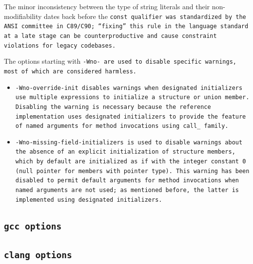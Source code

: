 \begin{itemize}
\note\qquad The minor inconsistency between the type of string literals
and their non-modifiability dates back before the \tt{const}
qualifier was standardized by the ANSI committee in C89/C90;
``fixing'' this rule in the language standard at a late stage can be
counterproductive and cause constraint violations for legacy codebases.

\end{itemize}

The options starting with \tt{-Wno-} are used to disable
specific warnings, most of which are considered harmless.

\begin{itemize}

\item \tt{-Wno-override-init} disables warnings when designated initializers
use multiple expressions to initialize a structure or union member.
Disabling the warning is necessary because the reference
implementation uses designated initializers to provide the feature
of named arguments for method invocations using \tt{call_} family.

\item \tt{-Wno-missing-field-initializers} is used to disable warnings
about the absence of an explicit initialization of structure members,
which by default are initialized as if with the integer constant \tt{0}
(null pointer for members with pointer type).
This warning has been disabled to permit default arguments for method
invocations when named arguments are not used; as mentioned before,
the latter is implemented using designated initializers.

\end{itemize}

\enlargethispage*{\baselineskip}
\pagebreak

\subsection{\tt{gcc} options}


\subsection{\tt{clang} options}

